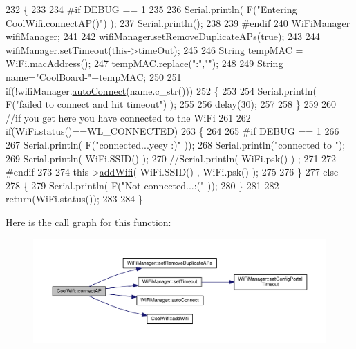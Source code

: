 \begin{DoxyCode}
232 \{
233 
234 \textcolor{preprocessor}{#if DEBUG == 1 }
235     
236     Serial.println( F(\textcolor{stringliteral}{"Entering CoolWifi.connectAP()"}) );   
237     Serial.println();
238 
239 \textcolor{preprocessor}{#endif}
240     \hyperlink{class_wi_fi_manager}{WiFiManager} wifiManager;
241     
242     wifiManager.\hyperlink{class_wi_fi_manager_a4dd1dbf4f22900f226a3897b88155212}{setRemoveDuplicateAPs}(\textcolor{keyword}{true});
243 
244     wifiManager.\hyperlink{class_wi_fi_manager_aa6493d59c284ff245edb767ff684756d}{setTimeout}(this->\hyperlink{class_cool_wifi_a952111605f25156588b5632caaba1c6f}{timeOut});
245     
246     String tempMAC = WiFi.macAddress();
247     tempMAC.replace(\textcolor{stringliteral}{":"},\textcolor{stringliteral}{""});
248 
249     String name=\textcolor{stringliteral}{"CoolBoard-"}+tempMAC;   
250 
251     \textcolor{keywordflow}{if}(!wifiManager.\hyperlink{class_wi_fi_manager_ae3cdfa6b02edcfe63d7da4f696b62136}{autoConnect}(name.c\_str())) 
252     \{
253 
254         Serial.println( F(\textcolor{stringliteral}{"failed to connect and hit timeout"}) );
255 
256         delay(30);
257 
258     \} 
259 
260     \textcolor{comment}{//if you get here you have connected to the WiFi}
261 
262     \textcolor{keywordflow}{if}(WiFi.status()==WL\_CONNECTED)
263     \{
264 
265 \textcolor{preprocessor}{    #if DEBUG == 1}
266 
267         Serial.println( F(\textcolor{stringliteral}{"connected...yeey :)"} ));
268         Serial.println(\textcolor{stringliteral}{"connected to "});
269         Serial.println( WiFi.SSID() );
270         \textcolor{comment}{//Serial.println( WiFi.psk() ) ;}
271         
272 \textcolor{preprocessor}{    #endif}
273 
274         this->\hyperlink{class_cool_wifi_a914d7a1df14dd6b75345fb614c34e9d6}{addWifi}( WiFi.SSID() , WiFi.psk() );
275         
276     \}
277     \textcolor{keywordflow}{else}
278     \{
279         Serial.println( F(\textcolor{stringliteral}{"Not connected...:("} ));
280     \}
281     
282     \textcolor{keywordflow}{return}(WiFi.status());
283 
284 \}
\end{DoxyCode}
Here is the call graph for this function\+:\nopagebreak
\begin{figure}[H]
\begin{center}
\leavevmode
\includegraphics[width=350pt]{d7/d29/class_cool_wifi_a7c857f27161782f5ef1d62d552aff971_cgraph}
\end{center}
\end{figure}
